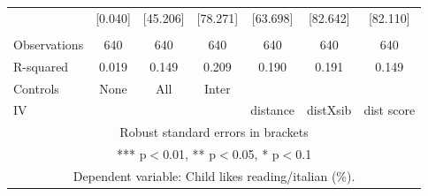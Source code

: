 \begin{tabular}{lcccccc}
 & [0.040] & [45.206] & [78.271] & [63.698] & [82.642] & [82.110] \\
 &  &  &  &  &  &  \\
Observations & 640 & 640 & 640 & 640 & 640 & 640 \\
R-squared & 0.019 & 0.149 & 0.209 & 0.190 & 0.191 & 0.149 \\
Controls & None & All & Inter &  &  &  \\
 IV &  &  &  & distance & distXsib & dist score \\ \hline
\multicolumn{7}{c}{ Robust standard errors in brackets} \\
\multicolumn{7}{c}{ *** p$<$0.01, ** p$<$0.05, * p$<$0.1} \\
\multicolumn{7}{c}{ Dependent variable: Child likes reading/italian (\%).} \\
\end{tabular}
